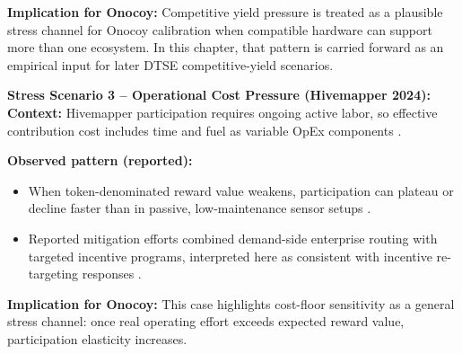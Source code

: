 \noindent\textbf{Implication for Onocoy:}
Competitive yield pressure is treated as a plausible stress channel for Onocoy calibration when compatible hardware can support more than one ecosystem. In this chapter, that pattern is carried forward as an empirical input for later DTSE competitive-yield scenarios.

\noindent\textbf{Stress Scenario 3 -- Operational Cost Pressure (Hivemapper 2024):}
\noindent\textbf{Context:}
Hivemapper participation requires ongoing active labor, so effective contribution cost includes time and fuel as variable OpEx components \cite{Chiu2024, FrontiersDePIN2025}.

\noindent\textbf{Observed pattern (reported):}
\begin{itemize}
    \item When token-denominated reward value weakens, participation can plateau or decline faster than in passive, low-maintenance sensor setups \cite{Chiu2024, FrontiersDePIN2025}.
    \item Reported mitigation efforts combined demand-side enterprise routing with targeted incentive programs, interpreted here as consistent with incentive re-targeting responses \cite{Chiu2024, FrontiersDePIN2025}.
\end{itemize}

\noindent\textbf{Implication for Onocoy:}
This case highlights cost-floor sensitivity as a general stress channel: once real operating effort exceeds expected reward value, participation elasticity increases.

